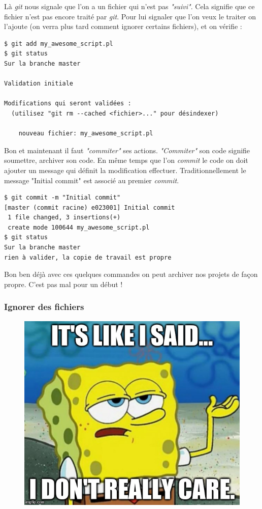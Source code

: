 \documentclass[12pt,a4paper]{article}
\begin{document}
Là \emph{git} nous signale que l'on a un fichier qui n'est pas \emph{"suivi"}. Cela signifie que ce fichier n'est pas encore traité par \emph{git}. Pour lui signaler que l'on veux le traiter on l'ajoute (on verra plus tard comment ignorer certains fichiers), et on vérifie :

\begin{verbatim}
$ git add my_awesome_script.pl 
$ git status
Sur la branche master

Validation initiale

Modifications qui seront validées :
  (utilisez "git rm --cached <fichier>..." pour désindexer)

	nouveau fichier: my_awesome_script.pl
\end{verbatim}

Bon et maintenant il faut \emph{"commiter"} ses actions. \emph{"Commiter"} son code signifie soumettre, archiver son code. En même temps que l'on \emph{commit} le code on doit ajouter un message qui définit la modification effectuer. Traditionnellement le message "Initial commit" est associé au premier \emph{commit}.

\begin{verbatim}
$ git commit -m "Initial commit"
[master (commit racine) e023001] Initial commit
 1 file changed, 3 insertions(+)
 create mode 100644 my_awesome_script.pl
$ git status
Sur la branche master
rien à valider, la copie de travail est propre
\end{verbatim}

Bon ben déjà avec ces quelques commandes on peut archiver nos projets de façon propre. C'est pas mal pour un début !


\subsubsection{Ignorer des fichiers}

\begin{figure}
\vspace*{-1\baselineskip}
\includegraphics[width=\linewidth]{dontcare}
\end{figure}
\end{document}
